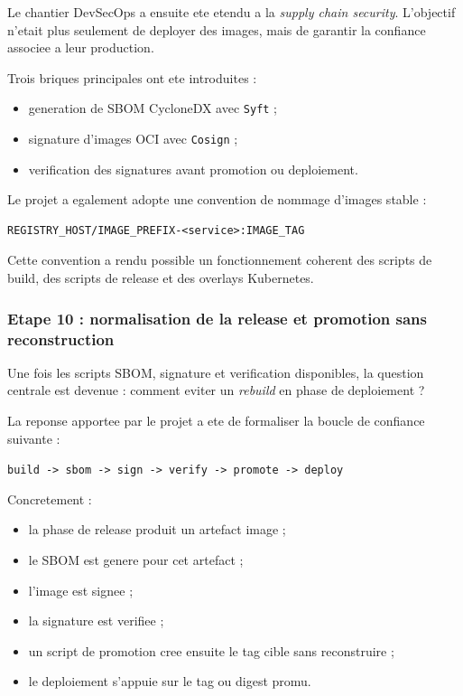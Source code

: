 Le chantier DevSecOps a ensuite ete etendu a la \textit{supply chain security}. L'objectif n'etait plus seulement de deployer des images, mais de garantir la confiance associee a leur production.

Trois briques principales ont ete introduites :

\begin{itemize}
  \item generation de SBOM CycloneDX avec \texttt{Syft} ;
  \item signature d'images OCI avec \texttt{Cosign} ;
  \item verification des signatures avant promotion ou deploiement.
\end{itemize}

Le projet a egalement adopte une convention de nommage d'images stable :

\begin{verbatim}
REGISTRY_HOST/IMAGE_PREFIX-<service>:IMAGE_TAG
\end{verbatim}

Cette convention a rendu possible un fonctionnement coherent des scripts de build, des scripts de release et des overlays Kubernetes.

\subsubsection{Etape 10 : normalisation de la release et promotion sans reconstruction}

Une fois les scripts SBOM, signature et verification disponibles, la question centrale est devenue : comment eviter un \textit{rebuild} en phase de deploiement ?

La reponse apportee par le projet a ete de formaliser la boucle de confiance suivante :

\begin{center}
\texttt{build -> sbom -> sign -> verify -> promote -> deploy}
\end{center}

Concretement :

\begin{itemize}
  \item la phase de release produit un artefact image ;
  \item le SBOM est genere pour cet artefact ;
  \item l'image est signee ;
  \item la signature est verifiee ;
  \item un script de promotion cree ensuite le tag cible sans reconstruire ;
  \item le deploiement s'appuie sur le tag ou digest promu.
\end{itemize}

